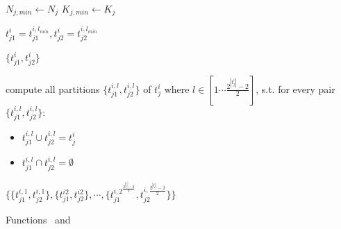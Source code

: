 \begin{algorithm}[H]
\DontPrintSemicolon
  
\begin{algorithmic}
\tiny
{} 
\State $N_{j, min} \leftarrow N_j$   
\State $K_{j, min} \leftarrow K_j$    %

\State {}          


  $  t_{j1}^i =  t_{j1}^{i,l_{min}},  t_{j2} ^i = t_{j2}^{i, l_{min}}$
  

\Return $\{t_{j1}^i, t_{j2}^i\}$
\EndFunction
\end{algorithmic}   

\begin{algorithmic}
\tiny
{}
  \State  compute all partitions $\{t_{j1}^{i,l} , t_{j2}^{i,l}\}$ of $t_j^i$ where $l \in [1 \cdots \frac{2^{| t_j^i|}-2}{2}]$, s.t.  
 \State for every pair $\{t_{j1}^{i,l} , t_{j2}^{i,l}\}$: 
  
  \begin{itemize}
  \item $t_{j1}^{i,l} \cup  t_{j2}^{i,l} = t_j^i$
  \item $t_{j1}^{i,l} \cap  t_{j2}^{i,l} = \emptyset$
  \end{itemize}
 
 \Return $\{\{t_{j1}^{i,1} , t_{j2}^{i,1}\}, \{t_{j1}^{i2} , t_{j2}^{i2}\}, \cdots , \{t_{j1}^{i, 2^\frac{2^{| t_j^i|}-2}{2}} , t_{j2}^{i, \frac{2^{| t_j^i|}-2}{2}} \}  \}$

\EndFunction
\end{algorithmic}

\caption{Functions \splitt~and \partition}
\end{algorithm}
 
